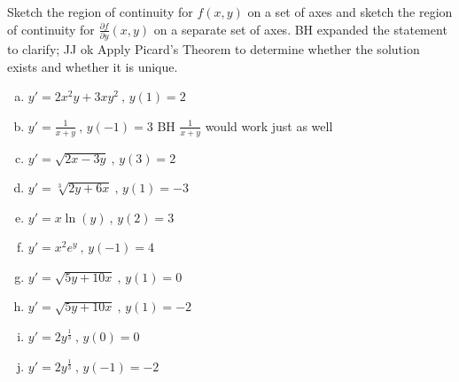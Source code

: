 \documentclass[12pt]{book}
\begin{document}

\begin{exercise}
{\color{blue}
Sketch the region of continuity for $f(x,y)$ on a set of axes and sketch the region of continuity for $\frac{\partial f}{\partial y}(x,y)$ on a separate set of axes.
}
{\color{teal}BH expanded the statement to clarify; JJ ok}
Apply Picard's Theorem to determine whether the solution exists and whether it is unique.

\begin{enumerate}[a)]
    \item $y' = 2x^2y + 3xy^2\ , \, y(1)=2$
    \item $y' = \frac{1}{x+y}\ , \, y(-1) = 3$
    {\color{teal}BH $\frac{1}{x+y}$ would work just as well}
    \item $y' = \sqrt{2x-3y} \ , \, y(3)=2$
    \item $y' = \sqrt[3]{2y+6x} \ , \, y(1)=-3$
    \item $y' = x \ln(y) \ , \,  y(2)=3$
    \item $y' = x^2 e^y \ , \, y(-1)=4$
    \item $y' = \sqrt{5y+10x} \ ,\,  y(1)=0$
    \item $y' = \sqrt{5y+10x} \ , \, y(1)=-2$
    \item $y' = 2y^{\frac{1}{3}} \ , \, y(0)=0$
    \item $y' = 2y^{\frac{1}{3}} \ , \, y(-1)=-2$
\end{enumerate}

\end{exercise}
\end{document}
